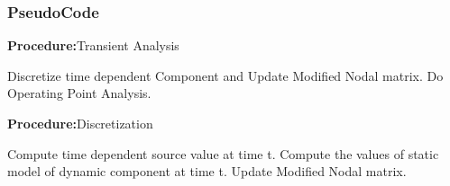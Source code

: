\documentclass{beamer}
\begin{document}
\begin{frame}
\frametitle{PseudoCode}
{\bf Procedure:}{Transient Analysis}
\small
\begin{algorithmic}[1]
\STATE Discretize time dependent Component and Update Modified Nodal matrix.
\STATE Do Operating Point Analysis.
\end{algorithmic}
\normalsize

{\bf Procedure:}{Discretization}
\small
\begin{algorithmic}[1]
\STATE Compute time dependent source value at time t.
\STATE Compute the values of static model of dynamic component at time t.
\STATE Update Modified Nodal matrix.
\end{algorithmic}
\normalsize
\end{frame}

\end{document}
